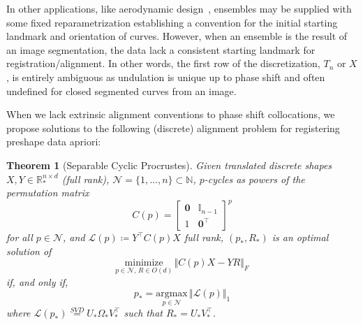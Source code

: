 \documentclass[pdflatex,iicol]{sn-jnl}%
\theoremstyle{thmstyleone}%
\newtheorem{theorem}{Theorem}%
\theoremstyle{thmstyletwo}%
\theoremstyle{thmstylethree}%
\begin{document}
In other applications, like aerodynamic design~\cite{grey2023separable}, ensembles may be supplied with some fixed reparametrization establishing a convention for the initial starting landmark and orientation of curves. However, when an ensemble is the result of an image segmentation, the data lack a consistent starting landmark for registration/alignment. In other words, the first row of the discretization, $T_n$ or $X$, is entirely ambiguous as undulation is unique up to phase shift and often undefined for closed segmented curves from an image.

When we lack extrinsic alignment conventions to phase shift collocations, we propose solutions to the following (discrete) alignment problem for registering preshape data apriori:

\begin{theorem}[Separable Cyclic Procrustes]\label{thm:cycl_Procrustes}
    Given translated discrete shapes $X,Y \in \mathbb{R}^{n\times d}_*$ (full rank), $\mathcal{N} = \lbrace 1,\dots,n\rbrace \subset \mathbb{N}$, $p$-cycles as powers of the permutation matrix
    $$
    C(p) = \begin{bmatrix}
      \boldsymbol{0}& \mathbb{I}_{n-1} \\
     1 &\boldsymbol{0}^{\top}
    \end{bmatrix}^p
    $$ for all $p\in\mathcal{N}$, and $\mathcal{L}(p) \coloneqq Y^{\top}C(p)X$ full rank, $(p_*, R_*)$ is an optimal solution of
    $$
    \underset{p \in \mathcal{N},\, R \in O(d)}{\text{minimize}}\,\Vert C(p)X - YR\Vert_{F}
    $$
    if, and only if,
    $$
    p_* = \underset{p\in \mathcal{N}}{\text{argmax}} \,\Vert \mathcal{L}(p) \Vert_1
    $$ 
    where $\mathcal{L}({p_*}) \overset{SVD}{=} U_{*}\Omega_{*}V_{*}^{\top}$ such that $R_* = U_{*}V^{\top}_{*}$.
\end{theorem}
\end{document}
